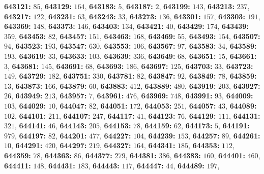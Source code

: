 \textsf{\bfseries 643121:} $85$, \textsf{\bfseries 643129:} $164$, \textsf{\bfseries 643183:} $5$, \textsf{\bfseries 643187:} $2$, \textsf{\bfseries 643199:} $143$, \textsf{\bfseries 643213:} $237$, \textsf{\bfseries 643217:} $122$, \textsf{\bfseries 643231:} $63$, \textsf{\bfseries 643243:} $33$, \textsf{\bfseries 643273:} $136$, \textsf{\bfseries 643301:} $157$, \textsf{\bfseries 643303:} $191$, \textsf{\bfseries 643369:} $148$, \textsf{\bfseries 643373:} $146$, \textsf{\bfseries 643403:} $134$, \textsf{\bfseries 643421:} $40$, \textsf{\bfseries 643429:} $174$, \textsf{\bfseries 643439:} $359$, \textsf{\bfseries 643453:} $82$, \textsf{\bfseries 643457:} $151$, \textsf{\bfseries 643463:} $168$, \textsf{\bfseries 643469:} $55$, \textsf{\bfseries 643493:} $154$, \textsf{\bfseries 643507:} $94$, \textsf{\bfseries 643523:} $193$, \textsf{\bfseries 643547:} $630$, \textsf{\bfseries 643553:} $106$, \textsf{\bfseries 643567:} $97$, \textsf{\bfseries 643583:} $34$, \textsf{\bfseries 643589:} $193$, \textsf{\bfseries 643619:} $33$, \textsf{\bfseries 643633:} $103$, \textsf{\bfseries 643639:} $336$, \textsf{\bfseries 643649:} $68$, \textsf{\bfseries 643651:} $15$, \textsf{\bfseries 643661:} $3$, \textsf{\bfseries 643681:} $145$, \textsf{\bfseries 643691:} $68$, \textsf{\bfseries 643693:} $186$, \textsf{\bfseries 643697:} $125$, \textsf{\bfseries 643703:} $33$, \textsf{\bfseries 643723:} $149$, \textsf{\bfseries 643729:} $182$, \textsf{\bfseries 643751:} $330$, \textsf{\bfseries 643781:} $82$, \textsf{\bfseries 643847:} $92$, \textsf{\bfseries 643849:} $78$, \textsf{\bfseries 643859:} $13$, \textsf{\bfseries 643873:} $166$, \textsf{\bfseries 643879:} $60$, \textsf{\bfseries 643883:} $412$, \textsf{\bfseries 643889:} $480$, \textsf{\bfseries 643919:} $203$, \textsf{\bfseries 643927:} $26$, \textsf{\bfseries 643949:} $213$, \textsf{\bfseries 643957:} $7$, \textsf{\bfseries 643961:} $476$, \textsf{\bfseries 643969:} $748$, \textsf{\bfseries 643991:} $93$, \textsf{\bfseries 644009:} $103$, \textsf{\bfseries 644029:} $10$, \textsf{\bfseries 644047:} $82$, \textsf{\bfseries 644051:} $172$, \textsf{\bfseries 644053:} $251$, \textsf{\bfseries 644057:} $43$, \textsf{\bfseries 644089:} $102$, \textsf{\bfseries 644101:} $211$, \textsf{\bfseries 644107:} $247$, \textsf{\bfseries 644117:} $41$, \textsf{\bfseries 644123:} $76$, \textsf{\bfseries 644129:} $111$, \textsf{\bfseries 644131:} $321$, \textsf{\bfseries 644141:} $46$, \textsf{\bfseries 644143:} $205$, \textsf{\bfseries 644153:} $78$, \textsf{\bfseries 644159:} $62$, \textsf{\bfseries 644173:} $5$, \textsf{\bfseries 644191:} $979$, \textsf{\bfseries 644197:} $82$, \textsf{\bfseries 644201:} $477$, \textsf{\bfseries 644227:} $104$, \textsf{\bfseries 644239:} $153$, \textsf{\bfseries 644257:} $89$, \textsf{\bfseries 644261:} $10$, \textsf{\bfseries 644291:} $420$, \textsf{\bfseries 644297:} $219$, \textsf{\bfseries 644327:} $164$, \textsf{\bfseries 644341:} $185$, \textsf{\bfseries 644353:} $112$, \textsf{\bfseries 644359:} $78$, \textsf{\bfseries 644363:} $86$, \textsf{\bfseries 644377:} $279$, \textsf{\bfseries 644381:} $386$, \textsf{\bfseries 644383:} $160$, \textsf{\bfseries 644401:} $460$, \textsf{\bfseries 644411:} $148$, \textsf{\bfseries 644431:} $183$, \textsf{\bfseries 644443:} $117$, \textsf{\bfseries 644447:} $44$, \textsf{\bfseries 644489:} $197$, 
